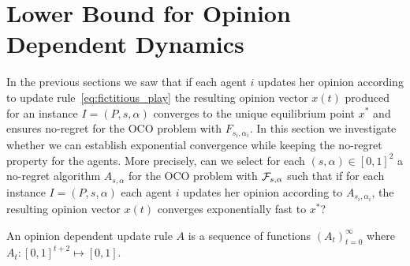 \section{Lower Bound for Opinion Dependent Dynamics}\label{s:lower_bound}

In the previous sections we saw that if each
agent $i$ updates her opinion according to
update rule~\ref{eq:fictitious_play}
the resulting opinion vector $x(t)$ produced
for an instance $I=(P,s,\alpha)$ converges
to the unique equilibrium point $x^*$ and
ensures no-regret for the OCO problem 
with $F_{s_i,\alpha_i}$. In this section we 
investigate whether we can establish exponential
convergence while keeping the no-regret property
for the agents. More precisely, can we select
for each $(s,\alpha) \in [0,1]^2$ a no-regret algorithm
$A_{s,\alpha}$ for the OCO problem with 
$\mathcal{F}_{s,\alpha}$ such that if for each instance
$I=(P,s,\alpha)$ each agent $i$ updates her 
opinion according to $A_{s_i,\alpha_i}$,
the resulting opinion vector $x(t)$ converges 
exponentially fast to $x^*$?


\begin{definition}\label{d:opinion_dependent_dynamics}
An opinion dependent update rule $A$ is a sequence of 
functions $(A_t)_{t=0}^\infty$ where
$A_t: [0,1]^{t+2}\mapsto [0,1]$.
\end{definition}

